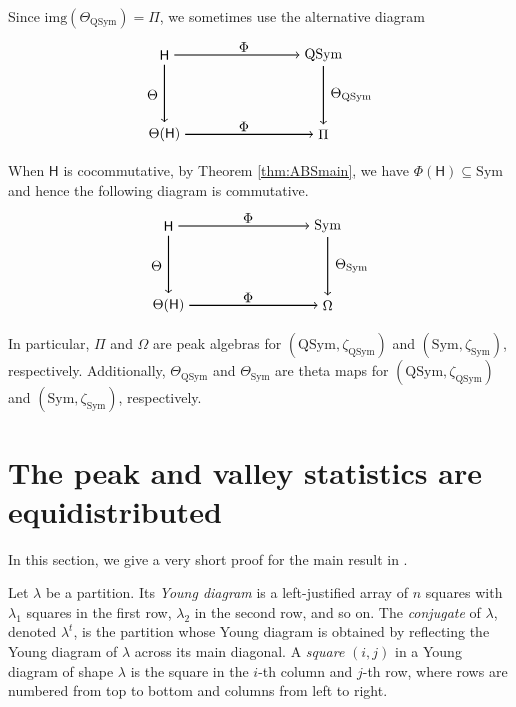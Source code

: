\documentclass[12pt]{amsart}
\numberwithin{equation}{section}
\newcommand{\QSym}{\mathrm{QSym}}
\newcommand{\Sym}{\mathrm{Sym}}
\newcommand{\img}{\mathrm{img}}
\begin{document}
Since $\img(\Theta_\QSym)=\Pi$, we sometimes use the alternative diagram
$$
\begin{tikzpicture}
\node(TV) at (0,0){$\mathsf{H}$};
\node(Sym) at (4,0){$\QSym$};
\node(OV) at (0,-2){$\Theta(\mathsf{H})$};
\node(Omega) at (4,-2){$\Pi$};

\draw[thick,->]  (TV)->(Sym);
\draw[thick,->]  (OV)->(Omega);
\draw[thick,->]   (TV)->(OV);
\draw[thick,->]   (Sym)->(Omega);

\node(Phi) at (2,0.2){$\Phi$};
\node(Phi) at (2,-1.8){$\Phi$};
\node(thetaV) at (-0.3,-1){$\Theta$};
\node(thetaV) at (4.7,-1){$\Theta_\QSym$};
\end{tikzpicture} 
$$
When $\mathsf{H}$ is cocommutative, by Theorem \ref{thm:ABSmain}, we have $\Phi(\mathsf{H})\subseteq\Sym$ and hence the following diagram is commutative. 
$$
\begin{tikzpicture}
\node(TV) at (0,0){$\mathsf{H}$};
\node(Sym) at (4,0){$\Sym$};
\node(OV) at (0,-2){$\Theta(\mathsf{H})$};
\node(Omega) at (4,-2){$\Omega$};

\draw[thick,->]  (TV)->(Sym);
\draw[thick,->]  (OV)->(Omega);
\draw[thick,->]   (TV)->(OV);
\draw[thick,->]   (Sym)->(Omega);

\node(Phi) at (2,0.2){$\Phi$};
\node(Phi) at (2,-1.8){$\Phi$};
\node(thetaV) at (-0.3,-1){$\Theta$};
\node(thetaV) at (4.6,-1){$\Theta_\Sym$};
\end{tikzpicture} 
$$
In particular, $\Pi$ and $\Omega$ are peak algebras for $(\QSym,\zeta_\QSym)$ and $(\Sym,\zeta_\Sym)$, respectively. Additionally, $\Theta_\QSym$ and $\Theta_\Sym$ are theta maps for $(\QSym,\zeta_\QSym)$ and $(\Sym,\zeta_\Sym)$, respectively.

\section{The peak and valley statistics are equidistributed}\label{sec:main}

In this section, we give a very short proof for the main result in \cite{Z24}. 

Let $\lambda$ be a partition. Its \emph{Young diagram} is a left-justified array of $n$ squares with $\lambda_1$ squares in the first row, $\lambda_2$ in the second row, and so on. The \emph{conjugate} of $\lambda$, denoted $\lambda^t$, is the partition whose Young diagram is obtained by reflecting the Young diagram of $\lambda$ across its main diagonal.  A \emph{square} $(i,j)$ in a Young diagram of shape $\lambda$ is the square in the $i$-th column and $j$-th row, where rows are numbered from top to bottom and columns from left to right.
\end{document}
